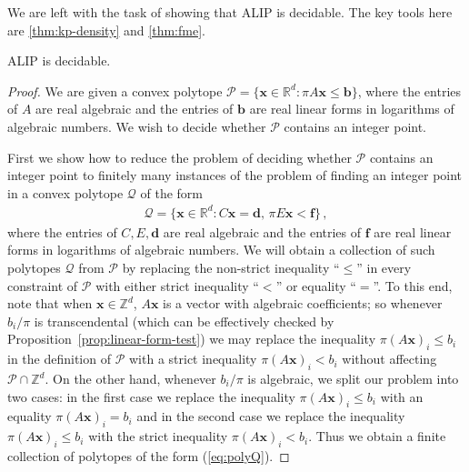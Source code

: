 \documentclass[format=acmsmall, review=false, screen=true]{acmart}
\newcommand{\Reals}{\mathbb{R}}
\newcommand{\Integers}{\mathbb{Z}}
\newcommand{\myvector}{\boldsymbol}
\begin{document}
We are left with the task of showing that ALIP is decidable.  The key
tools here are \cref{thm:kp-density} and \cref{thm:fme}.

\begin{proposition}
ALIP is decidable.
\label{prop:alip}
\end{proposition}

\begin{proof}
We are given a convex polytope $\mathcal{P}=\lbrace \myvector{x} \in
\Reals^{d} : \pi A \myvector{x} \leq \myvector{b} \rbrace$, where the
entries of $A$ are real algebraic and the entries of $\myvector{b}$
are real linear forms in logarithms of algebraic numbers.  We wish to
decide whether $\mathcal{P}$ contains an integer point. 

First we show how to reduce the problem of deciding whether
$\mathcal{P}$ contains an integer point to finitely many instances of
the problem of finding an integer point in a convex polytope $\mathcal{Q}$ of the form
\begin{gather} \mathcal{Q} = \{ \myvector{x}\in \Reals^d : C\myvector{x}=\myvector{d},\,
   \pi E\boldsymbol{x}<\boldsymbol{f} \} \, ,
\label{eq:polyQ}
\end{gather} where the entries of
   $C,E,\boldsymbol{d}$ are real algebraic and the entries of
$\myvector{f}$ are real linear forms in logarithms of algebraic
numbers.  We will obtain a collection of such polytopes $\mathcal{Q}$
from $\mathcal{P}$ by replacing the non-strict inequality ``$\leq$''
in every constraint of $\mathcal{P}$ with either strict inequality
``$<$'' or equality ``$=$''.  To this end, note that when
$\myvector{x} \in \Integers^{d}$, $A \myvector{x}$ is a vector with
algebraic coefficients; so whenever $b_{i} / \pi$ is transcendental
(which can be effectively checked by
Proposition~\ref{prop:linear-form-test}) we may replace the inequality
$\pi(A\boldsymbol{x})_i \leq b_i$ in the definition of $\mathcal{P}$
with a strict inequality $\pi(A\boldsymbol{x})_i < b_i$ without
affecting $\mathcal{P}\cap \Integers^{d}$.  On the other hand,
whenever $b_{i} / \pi$ is algebraic, we split our problem into two
cases: in the first case we replace the inequality
$\pi(A\boldsymbol{x})_i \leq b_i$ with an equality $\pi
(A\boldsymbol{x})_i = b_i$ and in the second case we replace the
inequality $\pi (A\boldsymbol{x})_i \leq b_i$ with the strict
inequality $\pi (A\boldsymbol{x})_i < b_i$.  Thus we obtain a finite
collection of polytopes of the form (\ref{eq:polyQ}).


\end{proof}
\end{document}
